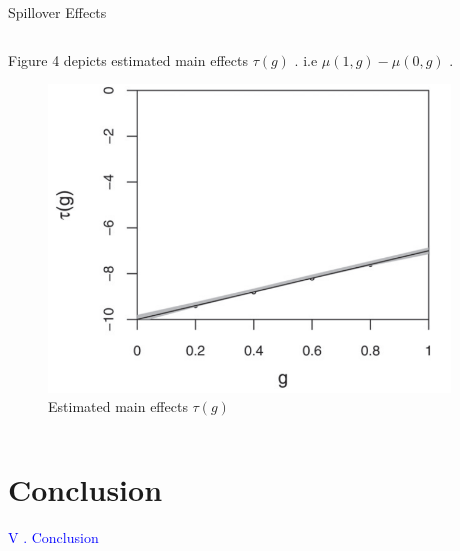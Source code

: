 \documentclass[notes,11pt, aspectratio=169]{beamer}
\begin{document}
\begin{frame}{Spillover Effects}
\begin{columns}[T] %
\begin{column}{\textwidth}
  \begin{wideitemize}
  \item  Figure 4 depicts estimated main effects $\tau(g)$ . i.e $\mu(1,g)-\mu(0,g)$ .  
   \begin{figure}[h]
   \centering
   \includegraphics[scale=0.58]{figure4.png}
   \caption{Estimated main effects $\tau(g)$}
   \label{fig:fig4}
   \end{figure}
  \end{wideitemize}
\end{column}%
\hfill%
\begin{column}{.38\textwidth}
  \vspace{20pt}
  \vspace{20pt}
\end{column}%
\end{columns}
\end{frame}


\section{Conclusion}
\begin{transitionframe}
  \begin{center}
    { \Huge \textcolor{blue}{V . Conclusion}}
  \end{center}
\end{transitionframe}
\end{document}
